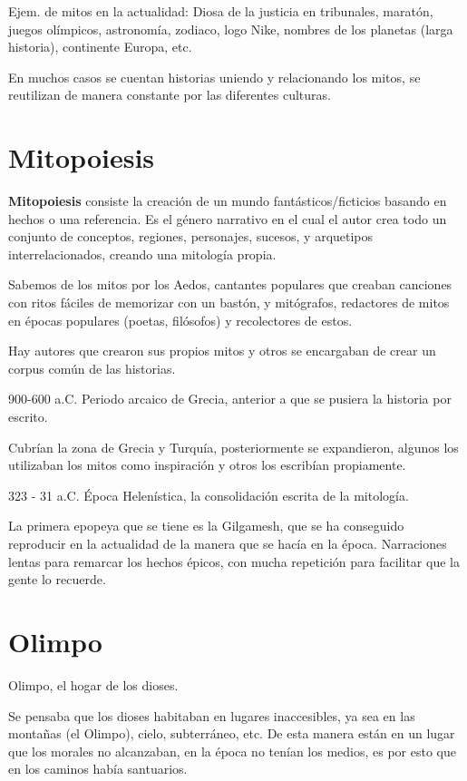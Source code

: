 Ejem. de mitos en la actualidad: Diosa de la justicia en tribunales, maratón, juegos olímpicos, astronomía, zodiaco, logo Nike, nombres de los planetas (larga historia), continente Europa, etc.

En muchos casos se cuentan historias uniendo y relacionando los mitos, se reutilizan de manera constante por las diferentes culturas.

\section{Mitopoiesis}
\textbf{Mitopoiesis} consiste la creación de un mundo fantásticos/ficticios basando en hechos o una referencia. Es el género narrativo en el cual el autor crea todo un conjunto de conceptos, regiones, personajes, sucesos, y arquetipos interrelacionados, creando una mitología propia.

Sabemos de los mitos por los Aedos, cantantes populares que creaban canciones con ritos fáciles de memorizar con un bastón, y mitógrafos, redactores de mitos en épocas populares (poetas, filósofos) y recolectores de estos.

Hay autores que crearon sus propios mitos y otros se encargaban de crear un corpus común de las historias.

900-600 a.C. Periodo arcaico de Grecia, anterior a que se pusiera la historia por escrito.

Cubrían la zona de Grecia y Turquía, posteriormente se expandieron, algunos los utilizaban los mitos como inspiración y otros los escribían propiamente.

323 - 31 a.C. Época Helenística, la consolidación escrita de la mitología.

La primera epopeya que se tiene es la Gilgamesh, que se ha conseguido reproducir en la actualidad de la manera que se hacía en la época. Narraciones lentas para remarcar los hechos épicos, con mucha repetición para facilitar que la gente lo recuerde.

\section{Olimpo}
Olimpo, el hogar de los dioses.

Se pensaba que los dioses habitaban en lugares inaccesibles, ya sea en las montañas (el Olimpo), cielo, subterráneo, etc. De esta manera están en un lugar que los morales no alcanzaban, en la época no tenían los medios, es por esto que en los caminos había santuarios.

